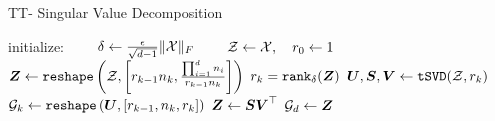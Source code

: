 \begin{algorithm} \caption{TT- Singular Value Decomposition} \label{alg:ttsvd}
\begin{algorithmic}[1]
    \State initialize: 
    \State $\qquad \delta \leftarrow \frac{\epsilon}{\sqrt{d-1}}\| \mathcal{X}\|_F$ 
    \State $\qquad \mathcal{Z} \leftarrow \mathcal{X}, \quad r_0 \leftarrow 1$ 
        \State $\boldsymbol{Z} \leftarrow \texttt{reshape}\left( \mathcal{Z}, \left[ r_{k-1}n_k, \frac{\prod_{i=1}^dn_i}{r_{k-1}n_k}\right]\right)$
        \State $r_k = \texttt{rank}_\delta (\boldsymbol{Z})$ 
        \State $ \boldsymbol{U},\boldsymbol{S},\boldsymbol{V} \leftarrow \texttt{tSVD}(\mathcal{Z}, r_k)$ 
        \State $\mathcal{G}_k \leftarrow \texttt{reshape}\left( \boldsymbol{U}, \left[ r_{k-1}, n_k, r_k\right]\right)$ 
        \State $\boldsymbol{Z} \leftarrow \boldsymbol{S}\boldsymbol{V}^\top$ 
    \EndFor
    \State $\mathcal{G}_d \leftarrow \boldsymbol{Z}$
\EndProcedure
\end{algorithmic}
\end{algorithm}